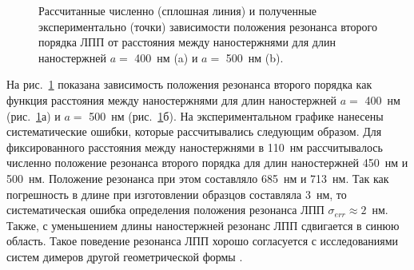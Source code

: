 
\begin{figure}
\caption{Рассчитанные численно (сплошная линия) и полученные экспериментально (точки) зависимости положения резонанса второго порядка ЛПП от расстояния между наностержнями для длин наностержней $ a = $ 400~нм (a) и $ a = $ 500~нм (b).}
\label{img:2res}
\end{figure}
На рис.~\ref{img:2res} показана зависимость положения резонанса второго порядка как функция расстояния между наностержнями для длин наностержней $ a = $ 400~нм (рис.~\ref{img:2res}а) и $ a = $ 500~нм (рис.~\ref{img:2res}б). На экспериментальном графике нанесены систематические ошибки, которые рассчитывались следующим образом. Для фиксированного расстояния между наностержнями в 110~нм рассчитывалось численно положение резонанса второго порядка для длин наностержней 450~нм и 500~нм. Положение резонанса при этом составляло 685~нм и 713~нм. Так как погрешность в длине при изготовлении образцов составляла 3~нм, то систематическая ошибка определения положения резонанса ЛПП  $ \sigma_{err} \approx 2 $~нм. Также, с уменьшением длины наностержней резонанс ЛПП сдвигается в синюю область. Такое поведение резонанса ЛПП хорошо согласуется с исследованиями систем димеров другой геометрической формы \cite{plasonrulereq, nanoprism}.

